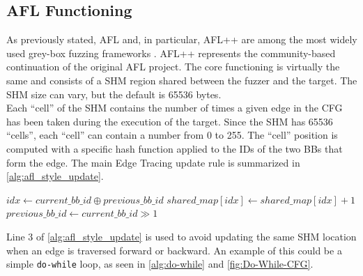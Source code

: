     \subsection{AFL Functioning}
    \cite{afl_technical_details}
        As previously stated, AFL and, in particular, AFL++ are among the most widely used grey-box
        fuzzing frameworks \cite{aflplusplus}.
        AFL++ represents the community-based continuation of the original AFL project.
        The core functioning is virtually the same and consists of a \gls{SHM} region shared between the fuzzer and the target.
        The \gls{SHM} size can vary, but the default is 65536 bytes.\\
        Each ``cell'' of the \gls{SHM} contains the number of times a given edge in the \gls{CFG} has been
            taken during the execution of the target. Since the \gls{SHM} has 65536 ``cells'', each ``cell''
            can contain a number from 0 to 255.
        The ``cell'' position is computed with a specific hash function applied to the IDs of the two \gls{BB}s
        that form the edge.
        The main Edge Tracing update rule is summarized in \cref{alg:afl_style_update}.
        \begin{algorithm}
            \caption{AFL-style SHM update rule}
            \label{alg:afl_style_update}
            \begin{algorithmic}[1]
                \STATE $idx \gets current\_bb\_id \oplus previous\_bb\_id$ 
                \STATE $shared\_map[idx] \gets shared\_map[idx]+1$ 
                \STATE $previous\_bb\_id \gets current\_bb\_id \gg 1$ 
            \end{algorithmic}
        \end{algorithm}
        Line 3 of \cref{alg:afl_style_update} is used to avoid updating the same \gls{SHM}
        location when an edge is traversed forward or backward.
        An example of this could be a simple \texttt{do-while} loop, as seen in \cref{alg:do-while} and \cref{fig:Do-While-CFG}.\\
